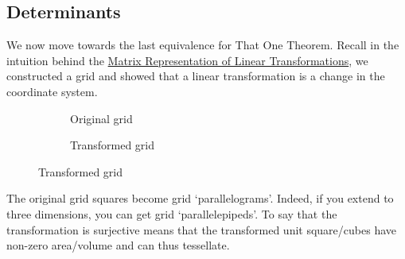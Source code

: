 \subsection{Determinants}
We now move towards the last equivalence for That One Theorem. Recall in the intuition behind the \hyperref[thm:2.48]{Matrix Representation of Linear Transformations}, we constructed a grid and showed that a linear transformation is a change in the coordinate system.\\
\begin{figure}[h]
	\begin{subfigure}[l]{0.4\textwidth}
			\caption{Original grid}
	\end{subfigure}
	\begin{subfigure}[r]{0.6\textwidth}
			\caption{Transformed grid}
	\end{subfigure}
\end{figure}
The original grid squares become grid `parallelograms'. Indeed, if you extend to three dimensions, you can get grid `parallelepipeds'.
To say that the transformation is surjective means that the transformed unit square/cubes have non-zero area/volume and can thus tessellate.



